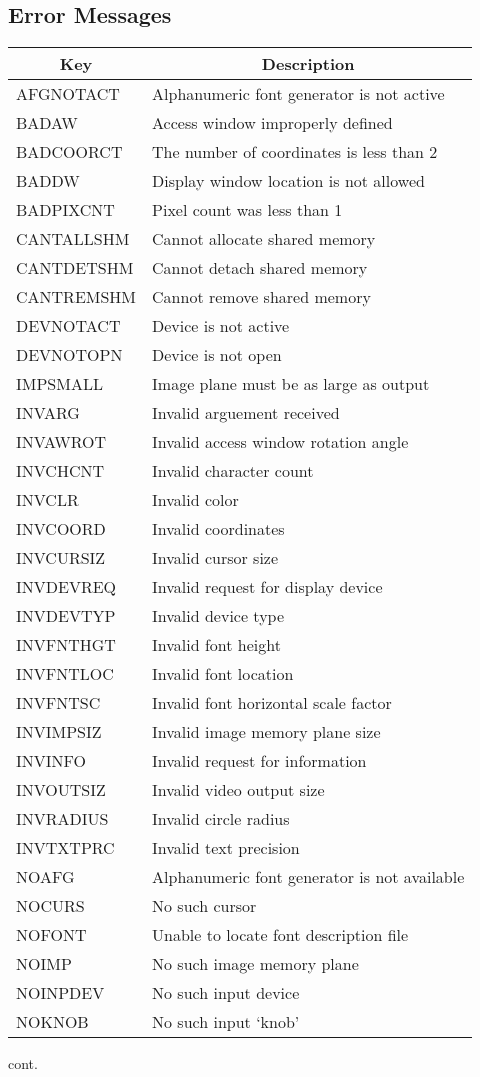 \subsection{Error Messages}
\begin{tabular}{|l|l|}
\hline
\multicolumn{1}{|c|}{Key}
&\multicolumn{1}{|c|}{Description}\\ \hline
AFGNOTACT & Alphanumeric font generator is not active\\
BADAW & Access window improperly defined\\
BADCOORCT & The number of coordinates is less than 2\\
BADDW & Display window location is not allowed\\
BADPIXCNT & Pixel count was less than 1\\
CANTALLSHM & Cannot allocate shared memory\\
CANTDETSHM & Cannot detach shared memory\\
CANTREMSHM & Cannot remove shared memory\\
DEVNOTACT & Device is not active\\
DEVNOTOPN & Device is not open\\
IMPSMALL & Image plane must be as large as output\\
INVARG & Invalid arguement received\\
INVAWROT & Invalid access window rotation angle\\
INVCHCNT & Invalid character count\\
INVCLR & Invalid color\\
INVCOORD & Invalid coordinates\\
INVCURSIZ & Invalid cursor size\\
INVDEVREQ & Invalid request for display device\\
INVDEVTYP & Invalid device type\\
INVFNTHGT & Invalid font height\\
INVFNTLOC & Invalid font location\\
INVFNTSC & Invalid font horizontal scale factor\\
INVIMPSIZ & Invalid image memory plane size\\
INVINFO & Invalid request for information\\
INVOUTSIZ & Invalid video output size\\
INVRADIUS & Invalid circle radius\\
INVTXTPRC & Invalid text precision\\
NOAFG & Alphanumeric font generator is not available\\
NOCURS & No such cursor\\
NOFONT & Unable to locate font description file\\
NOIMP & No such image memory plane\\
NOINPDEV & No such input device\\
NOKNOB & No such input `knob'\\
\hline
\end{tabular}
\newpage
cont.

